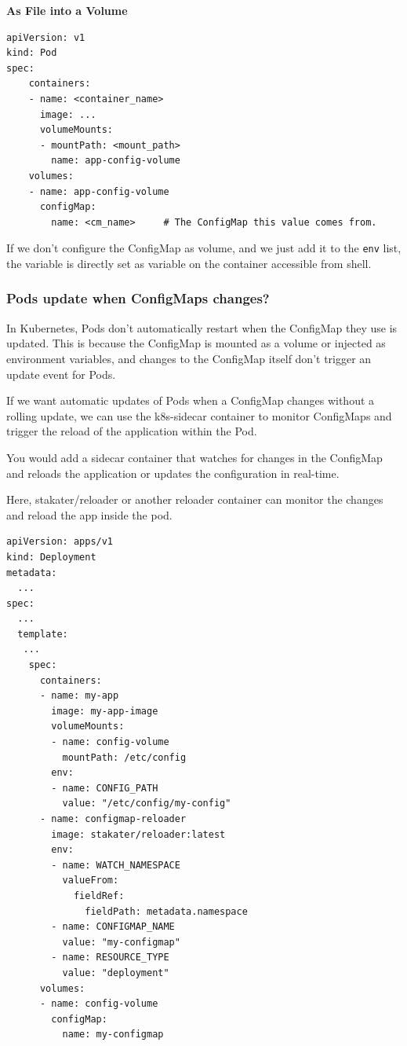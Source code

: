 \documentclass{article}
\newenvironment{blocktemplateII}[1]{%
    \tcolorbox[beamer,%
    noparskip,breakable,
    colframe=Green,%
    colbacklower=LimeGreen!75!LightGreen,%
    title=#1]}%
    {\endtcolorbox}
\newenvironment{codetemplate}[1][]{%
  \mybasecolorbox[#1]
  \itshape
}{%
  \endmybasecolorbox
}
\begin{document}
\textbf{As File into a Volume}
\begin{codetemplate}{}
\begin{verbatim}
apiVersion: v1
kind: Pod
spec:
    containers:
    - name: <container_name>
      image: ...
      volumeMounts:
      - mountPath: <mount_path>
        name: app-config-volume
    volumes:
    - name: app-config-volume
      configMap:
        name: <cm_name>     # The ConfigMap this value comes from.
\end{verbatim}
\end{codetemplate}

\begin{blocktemplateII}{NOTE}
If we don't configure the ConfigMap as volume, and we just add it to the \verb|env| list, the variable is directly set as variable on the container accessible from shell.
\end{blocktemplateII}

\subsubsection{Pods update when ConfigMaps changes?}
In Kubernetes, Pods don’t automatically restart when the ConfigMap they use is updated. This is because the ConfigMap is mounted as a volume or injected as environment variables, and changes to the ConfigMap itself don't trigger an update event for Pods.

If we want automatic updates of Pods when a ConfigMap changes without a rolling update, we can use the k8s-sidecar container to monitor ConfigMaps and trigger the reload of the application within the Pod.

You would add a sidecar container that watches for changes in the ConfigMap and reloads the application or updates the configuration in real-time.

Here, stakater/reloader or another reloader container can monitor the changes and reload the app inside the pod.

\begin{codetemplate}{}
\begin{verbatim}
apiVersion: apps/v1
kind: Deployment
metadata:
  ...
spec:
  ...
  template:
   ...
    spec:
      containers:
      - name: my-app
        image: my-app-image
        volumeMounts:
        - name: config-volume
          mountPath: /etc/config
        env:
        - name: CONFIG_PATH
          value: "/etc/config/my-config"
      - name: configmap-reloader
        image: stakater/reloader:latest
        env:
        - name: WATCH_NAMESPACE
          valueFrom:
            fieldRef:
              fieldPath: metadata.namespace
        - name: CONFIGMAP_NAME
          value: "my-configmap"
        - name: RESOURCE_TYPE
          value: "deployment"
      volumes:
      - name: config-volume
        configMap:
          name: my-configmap
\end{verbatim}
\end{codetemplate}
\end{document}
